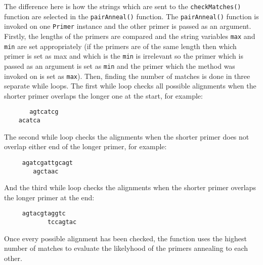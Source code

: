 The difference here is how the strings which are sent to the
\texttt{checkMatches()} function are selected in the
\texttt{pairAnneal()} function. The \texttt{pairAnneal()} function is
invoked on one \texttt{Primer} instance and the other primer is passed
as an argument. Firstly, the lengths of the primers are compared and the
string variables \texttt{max} and \texttt{min} are set appropriately (if
the primers are of the same length then which primer is set as \textt
{max} and which is the \texttt{min} is irrelevant so the primer which is
passed as an argument is set as \texttt{min} and the primer which the
method was invoked on is set as \texttt{max}). Then, finding the number
of matches is done in three separate while loops. The first while loop
checks all possible alignments when the shorter primer overlaps the
longer one at the start, for example:
\begin{verbatim}
       agtcatcg
    acatca
\end{verbatim}
The second while loop checks the alignments when the shorter primer does
not overlap either end of the longer primer, for example:
\begin{verbatim}
     agatcgattgcagt
        agctaac
\end{verbatim}
And the third while loop checks the alignments when the shorter primer
overlaps the longer primer at the end:
\begin{verbatim}
     agtacgtaggtc
            tccagtac
\end{verbatim}
Once every possible alignment has been checked, the function uses the
highest number of matches to evaluate the likelyhood of the primers
annealing to each other.













